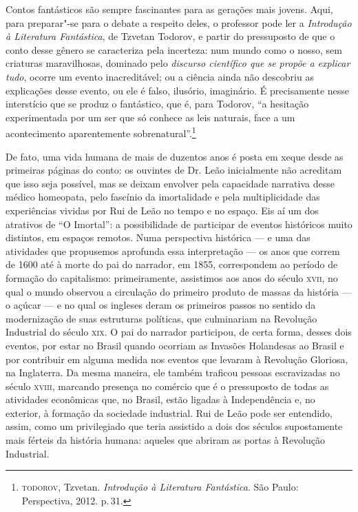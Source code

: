 Contos fantásticos são sempre fascinantes para as gerações mais jovens.
Aqui, para preparar"-se para o debate a respeito deles, o professor pode
ler a \emph{Introdução à Literatura Fantástica}, de Tzvetan Todorov, e
partir do pressuposto de que o conto desse gênero se caracteriza pela
incerteza: num mundo como o nosso, sem criaturas maravilhosas, dominado
pelo \emph{discurso científico que se propõe a explicar tudo}, ocorre um
evento inacreditável; ou a ciência ainda não descobriu as explicações
desse evento, ou ele é falso, ilusório, imaginário. É precisamente nesse
interstício que se produz o fantástico, que é, para Todorov, ``a
hesitação experimentada por um ser que só conhece as leis naturais, face
a um acontecimento aparentemente sobrenatural''.\footnote{\textsc{todorov},
  Tzvetan. \textit{Introdução à Literatura Fantástica}. São Paulo:
  Perspectiva, 2012. p.\,31.}

De fato, uma vida humana de mais de duzentos anos é posta em xeque desde
as primeiras páginas do conto: os ouvintes de Dr. Leão inicialmente não
acreditam que isso seja possível, mas se deixam envolver pela capacidade
narrativa desse médico homeopata, pelo fascínio da imortalidade e pela
multiplicidade das experiências vividas por Rui de Leão no tempo e no
espaço. Eis aí um dos atrativos de ``O Imortal'': a possibilidade de
participar de eventos históricos muito distintos, em espaços remotos.
Numa perspectiva histórica --- e uma das atividades que propusemos
aprofunda essa interpretação --- os anos que correm de 1600 até à morte
do pai do narrador, em 1855, correspondem ao período de formação do
capitalismo: primeiramente, assistimos aos anos do século \textsc{xvii}, no qual
o mundo observou a circulação do primeiro produto de massas da história
--- o açúcar --- e no qual os ingleses deram os primeiros passos no
sentido da modernização de suas estruturas políticas, que culminariam na
Revolução Industrial do século \textsc{xix}. O pai do narrador participou, de
certa forma, desses dois eventos, por estar no Brasil quando ocorriam as
Invasões Holandesas ao Brasil e por contribuir em alguma medida nos
eventos que levaram à Revolução Gloriosa, na Inglaterra. Da mesma
maneira, ele também traficou pessoas escravizadas no século \textsc{xviii},
marcando presença no comércio que é o pressuposto de todas as atividades
econômicas que, no Brasil, estão ligadas à Independência e, no exterior,
à formação da sociedade industrial. Rui de Leão pode ser entendido,
assim, como um privilegiado que teria assistido a dois dos séculos
supostamente mais férteis da história humana: aqueles que abriram as
portas à Revolução Industrial.

